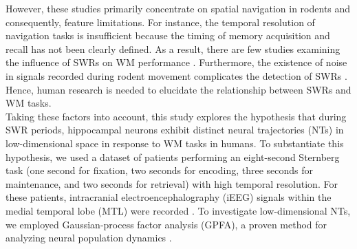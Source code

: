 \indent
However, these studies primarily concentrate on spatial navigation in rodents and consequently, feature limitations. For instance, the temporal resolution of navigation tasks is insufficient because the timing of memory acquisition and recall has not been clearly defined. As a result, there are few studies examining the influence of SWRs on WM performance \cite{jadhav_awake_2012}. Furthermore, the existence of noise in signals recorded during rodent movement complicates the detection of SWRs \cite{Watanabe_2021}. Hence, human research is needed to elucidate the relationship between SWRs and WM tasks.
\\
\indent
Taking these factors into account, this study explores the hypothesis that during SWR periods, hippocampal neurons exhibit distinct neural trajectories (NTs) in low-dimensional space in response to WM tasks in humans. To substantiate this hypothesis, we used a dataset of patients performing an eight-second Sternberg task (one second for fixation, two seconds for encoding, three seconds for maintenance, and two seconds for retrieval) with high temporal resolution. For these patients, intracranial electroencephalography (iEEG) signals within the medial temporal lobe (MTL) were recorded \cite{boran_dataset_2020}. To investigate low-dimensional NTs, we employed Gaussian-process factor analysis (GPFA), a proven method for analyzing neural population dynamics \cite{yu_gaussian-process_2009}.
\label{sec:introduction}